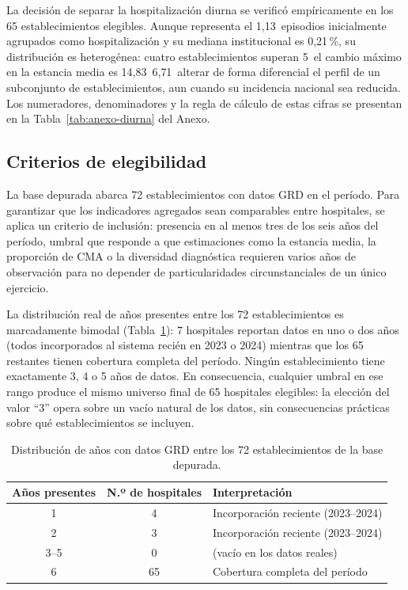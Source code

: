 La decisión de separar la hospitalización diurna se verificó empíricamente en
los 65 establecimientos elegibles. Aunque representa el 1{,}13\,%
episodios inicialmente agrupados como hospitalización y su mediana institucional
es 0{,}21\,\%, su distribución es heterogénea: cuatro establecimientos superan
5\,%
el cambio máximo en la estancia media es 14{,}83\,%
6{,}71\,%
alterar de forma diferencial el perfil de un subconjunto de establecimientos,
aun cuando su incidencia nacional sea reducida. Los numeradores, denominadores
y la regla de cálculo de estas cifras se presentan en la
Tabla~\ref{tab:anexo-diurna} del Anexo.

\subsection{Criterios de elegibilidad}
\label{sec:elegibilidad}

La base depurada abarca 72 establecimientos con datos GRD en el período. Para
garantizar que los indicadores agregados sean comparables entre hospitales, se
aplica un criterio de inclusión: presencia en al menos tres de los seis años
del período, umbral que responde a que estimaciones como la estancia media, la
proporción de CMA o la diversidad diagnóstica requieren varios años de
observación para no depender de particularidades circunstanciales de un único
ejercicio.

La distribución real de años presentes entre los 72 establecimientos es
marcadamente bimodal (Tabla~\ref{tab:distribucion-anios}): 7 hospitales
reportan datos en uno o dos años (todos incorporados al sistema recién en
2023 o 2024) mientras que los 65 restantes tienen cobertura completa del
período. Ningún establecimiento tiene exactamente 3, 4 o 5 años de datos. En
consecuencia, cualquier umbral en ese rango produce el mismo universo final de
65 hospitales elegibles: la elección del valor ``3'' opera sobre un vacío
natural de los datos, sin consecuencias prácticas sobre qué establecimientos
se incluyen.

\begin{table}[htbp]
\centering
\caption{Distribución de años con datos GRD entre los 72 establecimientos de la base depurada.}
\label{tab:distribucion-anios}
\begin{tabular}{c c l}
\toprule
\textbf{Años presentes} & \textbf{N.º de hospitales} & \textbf{Interpretación} \\
\midrule
1 & 4  & Incorporación reciente (2023--2024) \\
2 & 3  & Incorporación reciente (2023--2024) \\
3--5 & 0  & (vacío en los datos reales) \\
6 & 65 & Cobertura completa del período \\
\bottomrule
\end{tabular}
\end{table}


